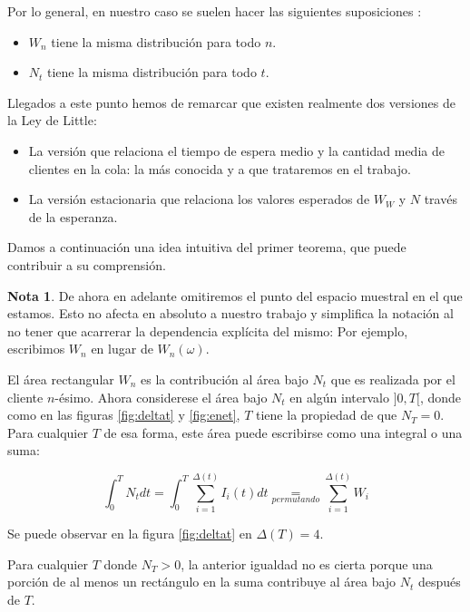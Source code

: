 \documentclass[a4paper,10pt]{scrartcl}
\theoremstyle{definition}
\newtheorem*{rmk*}{Nota}
\numberwithin{equation}{section}
\begin{document}
	Por lo general, en nuestro caso se suelen hacer las siguientes suposiciones :
	\begin{itemize}
		\item $W_n$ tiene la misma distribución para todo $n$.
		\item $N_t$ tiene la misma distribución para todo $t$.
	\end{itemize} 
	
	Llegados a este punto hemos de remarcar que existen realmente dos versiones de la Ley de Little: 
	
	\begin{itemize}
		\item La versión que relaciona el tiempo de espera medio y la cantidad media de clientes en la cola: 
		la más conocida y a que trataremos en el trabajo.
		\item La versión estacionaria que relaciona los valores esperados de $W_W$ y $N$ través de la esperanza. 
	\end{itemize}
	
	Damos a continuación una idea intuitiva del primer teorema, que puede contribuir a su comprensión.
	
	\begin{rmk*}
		De ahora en adelante omitiremos el punto del espacio muestral en el que estamos. Esto no afecta 
		en absoluto a nuestro trabajo y simplifica la notación al no tener que acarrerar la dependencia 
		explícita del mismo: Por ejemplo, escribimos $W_n$ en lugar de $W_n(\omega)$. 
	\end{rmk*}
	
	El área rectangular $W_n$ es la contribución al área bajo $N_t$ que es realizada por el cliente $n$-ésimo. 
	Ahora considerese el área bajo $N_t$ en algún intervalo $]0,T[$, donde como en las figuras \ref{fig:deltat}
	y \ref{fig:enet}, $T$ tiene la propiedad de que $N_T = 0$. Para cualquier $T$ de esa forma, este área puede 
	escribirse como una integral o una suma:
	
	\[\int_{0}^{T} N_t dt=\int_{0}^{T} \sum_{i=1}^{\Delta (t)} I_i(t) dt \underset{permutando}{=}\sum_{i=1}^{\Delta (t)} W_i\]
	
	Se puede observar en la figura \ref{fig:deltat} en $\Delta(T) = 4$.
	
	Para cualquier $T$ donde $N_T > 0$, la anterior igualdad no es cierta porque una porción de al menos un 
	rectángulo en la suma contribuye al área bajo $N_t$ después de $T$. 
	
\end{document}

